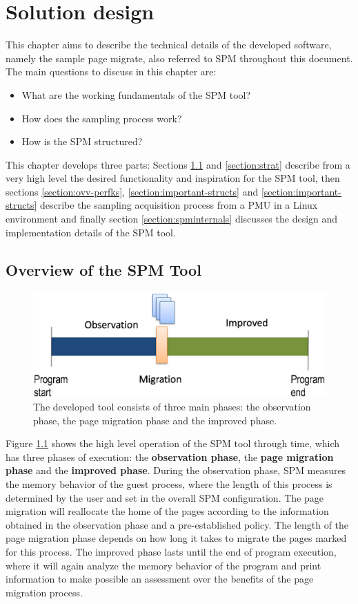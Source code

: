 \chapter{Solution design}\label{chapter:soldesign}
This chapter aims to describe the technical details of the developed software, namely the sample page migrate, also referred to SPM throughout this document. The main questions to discuss in this chapter are:
\begin{itemize}
	\item What are the working fundamentals of the SPM tool?
	\item How does the sampling process work?
	\item How is the SPM structured?
\end{itemize}

This chapter develops three parts: Sections \ref{section:ovv-SPM} and \ref{section:strat} describe from a very high level the desired functionality and inspiration for the SPM tool, then sections \ref{section:ovv-perfks}, \ref{section:important-structs} and \ref{section:important-structs} describe the sampling acquisition process from a PMU in a Linux environment and finally section \ref{section:spminternals} discusses the design and implementation details of the SPM tool.


\section{Overview of the SPM Tool}\label{section:ovv-SPM}


\begin{figure}[ht]
	\centering
		\includegraphics[width=.6\textwidth]{figures/SPM-principle.eps}
		\caption[Three phases of execution of the SPM development]{The developed tool consists of three main phases: the observation phase, the page migration phase and the improved phase.}
		\label{fig:sprinciple}
\end{figure}

Figure \ref{fig:sprinciple} shows the high level operation of the SPM tool through time, which has three phases of execution: the \textbf{observation phase}, the \textbf{page migration phase} and the \textbf{improved phase}. During the observation phase, SPM measures the memory behavior of the guest process, where the length of this process is determined by the user and set in the overall SPM configuration. The page migration will reallocate the home of the pages according to the information obtained in the observation phase and a pre-established policy. The length of the page migration phase depends on how long it takes to migrate the pages marked for this process. The improved phase lasts until the end of program execution, where it will again analyze the memory behavior of the program and print information to make possible an assessment over the benefits of the page migration process.

